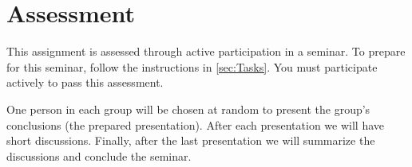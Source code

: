 \section{Assessment}%
\label{Assessment}

This assignment is assessed through active participation in a seminar.
To prepare for this seminar, follow the instructions in \cref{sec:Tasks}.
You must participate actively to pass this assessment.

One person in each group will be chosen at random to present the group's 
conclusions (the prepared presentation).
After each presentation we will have short discussions.
Finally, after the last presentation we will summarize the discussions and 
conclude the seminar.



\begin{frame}[allowframebreaks]
  \printbibliography{}
\end{frame}
